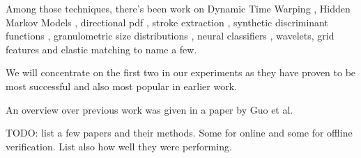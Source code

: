 \documentclass[a4paper, oneside]{csthesis}
\begin{document}
Among those techniques, there's been work on Dynamic Time Warping \cite{Herbst98onan} \cite{citeulike:891512}, Hidden Markov Models \cite{Justino00anoff-line}, directional pdf \cite{drouhard_1996_pr}, stroke extraction \cite{1047809}, synthetic discriminant functions \cite{Wilkinson:91}, granulometric size distributions \cite{615447}, neural classifiers \cite{Bajaj19971}, wavelets\cite{Ramesh1999217}, grid features\cite{Qi19941621} and elastic matching\cite{citeulike:941886} to name a few. \cite{PiyushShanker:2007:OSV:1274199.1274423}

We will concentrate on the first two in our experiments as they have proven to be most successful and also most popular in earlier work.

An overview over previous work was given in a paper by Guo et al. \cite{Justino20051377}

TODO: list a few papers and their methods. Some for online and some for offline verification. List also how well they were performing.




\end{document}
